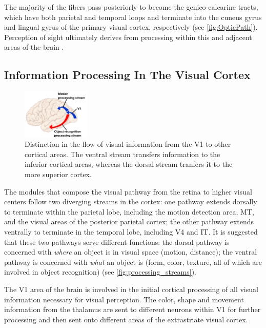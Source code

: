 The majority of the fibers pass posteriorly to become the genico-calcarine tracts, which have both parietal and temporal loops and terminate into the cuneus gyrus and lingual gyrus of the primary visual cortex, respectively (see \autoref{fig:OpticPath}). Perception of sight ultimately derives from processing within this and adjacent areas of the brain \cite{Gupta2022}.

\subsection{Information Processing In The Visual Cortex}

\begin{figure}
	\centering
	\includegraphics[width = 0.29\textwidth]{assets/images/Info_distinction_from_vis_cortex.jpg}
	\caption{Distinction in the flow of visual information from the \gls{V1} to other cortical areas. The ventral stream transfers information to the inferior cortical areas, whereas the dorsal stream tranfers it to the more superior cortex.}
	\label{fig:processing_streams}
\end{figure}

The modules that compose the visual pathway from the retina to higher visual centers follow two diverging streams in the cortex: one pathway extends dorsally to terminate within the parietal lobe, including the motion detection area, \gls{MT}, and the visual areas of the posterior parietal cortex; the other pathway extends ventrally to terminate in the temporal lobe, including \gls{V4} and \gls{IT}. It is suggested \cite{Mishkin1983} that these two pathways serve different functions: the dorsal pathway is concerned with \textit{where} an object is in visual space (motion, distance); the ventral pathway is concerned with \textit{what} an object is (form, color, texture, all of which are involved in object recognition) (see \autoref{fig:processing_streams}).

The \gls{V1} area of the brain is involved in the initial cortical processing of all visual information necessary for visual perception. The color, shape and movement information from the thalamus are sent to different neurons within \gls{V1} for further processing and then sent onto different areas of the extrastriate visual cortex. 

